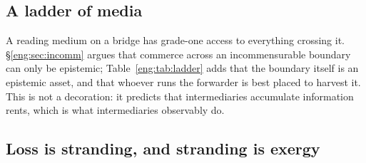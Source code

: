 \subsection{A ladder of media}\label{eng:S5.2}

\begin{table}[t]
\centering\small
{}
\caption{Media classified by behavior. The enzyme is the top rung, so the
fourth access profile of Table~\ref{eng:tab:profiles} is not a separate kind of
thing but the most behaviorally elaborate interposition.}
\label{eng:tab:ladder}
\end{table}

\begin{remark}\label{eng:intermediary-learns-most}
A reading medium on a bridge has grade-one access to everything crossing
it. \S\ref{eng:sec:incomm} argues that commerce across an incommensurable
boundary can only be epistemic; Table~\ref{eng:tab:ladder} adds that the
boundary itself is an epistemic asset, and that whoever runs the forwarder
is best placed to harvest it. This is not a decoration: it predicts that
intermediaries accumulate information rents, which is what intermediaries
observably do.
\end{remark}

\subsection{Loss is stranding, and stranding is exergy}\label{eng:S5.3}

